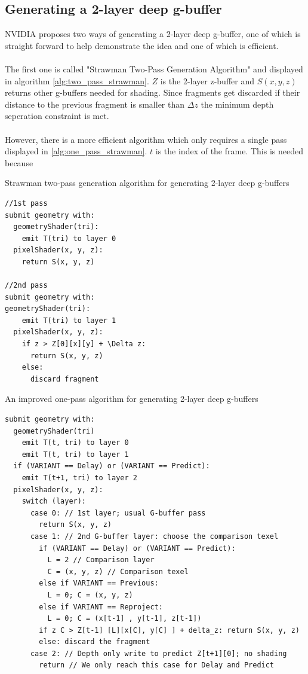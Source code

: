 \documentclass{ACGSeminar}
\begin{document}
	\subsection{Generating a 2-layer deep g-buffer}
		NVIDIA proposes two ways of generating a 2-layer deep g-buffer, one of which is straight forward to help demonstrate the idea and one of which is efficient. \\\\
		The first one is called "Strawman Two-Pass Generation Algorithm" and displayed in algorithm \ref{alg:two_pass_strawman}. $Z$ is the 2-layer z-buffer and $S(x, y, z)$ returns other g-buffers needed for shading. Since fragments get discarded if their distance to the previous fragment is smaller than $\Delta z$ the minimum depth seperation constraint is met. \\\\
		However, there is a more efficient algorithm which only requires a single pass displayed in \ref{alg:one_pass_strawman}. $t$ is the index of the frame. This is needed because 
		\begin{algorithm} \label{alg:two_pass_strawman} \caption{Strawman two-pass generation algorithm for generating 2-layer deep g-buffers}
		\begin{lstlisting}[frame=single]
//1st pass
submit geometry with:
  geometryShader(tri):
    emit T(tri) to layer 0
  pixelShader(x, y, z):
    return S(x, y, z)

//2nd pass
submit geometry with:
geometryShader(tri):
    emit T(tri) to layer 1
  pixelShader(x, y, z):
    if z > Z[0][x][y] + \Delta z:
      return S(x, y, z)
    else:
      discard fragment
		\end{lstlisting}
		\end{algorithm}
		 
		\begin{algorithm} \label{alg:one_pass_strawman} \caption{An improved one-pass algorithm for generating 2-layer deep g-buffers}
		\begin{lstlisting}[frame=single]
submit geometry with:
  geometryShader(tri)
    emit T(t, tri) to layer 0
    emit T(t, tri) to layer 1
  if (VARIANT == Delay) or (VARIANT == Predict):
    emit T(t+1, tri) to layer 2
  pixelShader(x, y, z):
    switch (layer):
      case 0: // 1st layer; usual G-buffer pass
        return S(x, y, z)
      case 1: // 2nd G-buffer layer: choose the comparison texel
        if (VARIANT == Delay) or (VARIANT == Predict):
          L = 2 // Comparison layer
          C = (x, y, z) // Comparison texel
        else if VARIANT == Previous:
          L = 0; C = (x, y, z)
        else if VARIANT == Reproject:
          L = 0; C = (x[t-1] , y[t-1], z[t-1])
        if z C > Z[t-1] [L][x[C], y[C] ] + delta_z: return S(x, y, z)
        else: discard the fragment
      case 2: // Depth only write to predict Z[t+1][0]; no shading
        return // We only reach this case for Delay and Predict
		\end{lstlisting}
		\end{algorithm}
\end{document}
